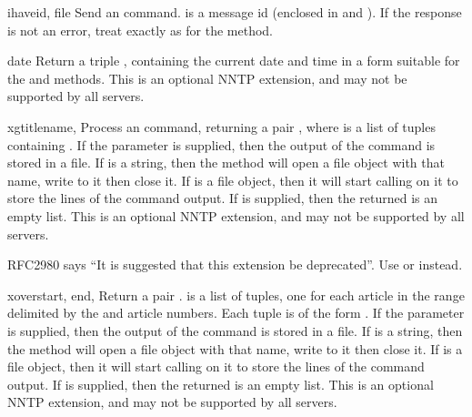 \begin{methoddesc}{ihave}{id, file}
Send an  command.  is a message id (enclosed in 
\character{<} and \character{>}).
If the response is not an error, treat
 exactly as for the  method.
\end{methoddesc}

\begin{methoddesc}{date}{}
Return a triple ,
containing the current date and time in a form suitable for the
 and  methods.
This is an optional NNTP extension, and may not be supported by all
servers.
\end{methoddesc}

\begin{methoddesc}{xgtitle}{name, }
Process an  command, returning a pair , where  is a list of tuples containing
.
If the  parameter is supplied, then the output of the 
 command is stored in a file.  If  is a string, 
then the method will open a file object with that name, write to it 
then close it.  If  is a file object, then it will start
calling  on it to store the lines of the command output.
If  is supplied, then the returned  is an empty list.
This is an optional NNTP extension, and may not be supported by all
servers.

RFC2980 says ``It is suggested that this extension be deprecated''.  Use
 or  instead.
\end{methoddesc}

\begin{methoddesc}{xover}{start, end, }
Return a pair .   is a list
of tuples, one for each article in the range delimited by the 
and  article numbers.  Each tuple is of the form
.
If the  parameter is supplied, then the output of the 
 command is stored in a file.  If  is a string, 
then the method will open a file object with that name, write to it 
then close it.  If  is a file object, then it will start
calling  on it to store the lines of the command output.
If  is supplied, then the returned  is an empty list.
This is an optional NNTP extension, and may not be supported by all
servers.
\end{methoddesc}

